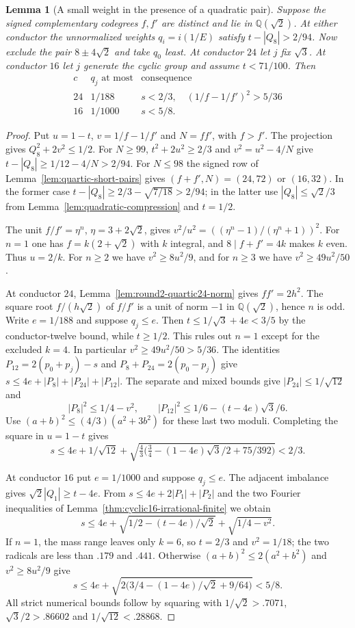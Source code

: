 \documentclass[11pt,reqno]{amsart}
\newtheorem{lemma}[theorem]{Lemma}
\theoremstyle{remark}\newtheorem{remark}[theorem]{Remark}
\numberwithin{equation}{section}
\begin{document}
\begin{lemma}[A small weight in the presence of a quadratic pair]\label{lem:1624-weight-cut}
Suppose the signed complementary codegrees $f,f'$ are distinct and
lie in $\mathbb Q(\sqrt2)$. At either conductor the unnormalized
weights $q_i=i(1/E)$ satisfy $t-|Q_8|>2/94$. Now exclude the pair
$8\pm4\sqrt2$ and take $q_0$ least. At conductor $24$ let $j$ fix
$\sqrt3$. At conductor $16$ let $j$ generate the cyclic group and
assume $t<71/100$. Then
\[
 \begin{array}{c|c|c}
 c&q_j\text{ at most}&\text{consequence}\\\hline
 24&1/188&s<2/3,\quad(1/f-1/f')^2>5/36\\
 16&1/1000&s<5/8 .
 \end{array}
\]
\end{lemma}
\begin{proof}
Put $u=1-t$, $v=1/f-1/f'$ and $N=ff'$, with $f>f'$.
The projection gives $Q_8^2+2v^2\le1/2$. For $N\ge99$,
$t^2+2u^2\ge2/3$ and $v^2=u^2-4/N$ give
$t-|Q_8|\ge1/12-4/N>2/94$. For $N\le98$ the signed row of
Lemma~\ref{lem:quartic-short-pairs} gives $(f+f',N)=(24,72)$ or
$(16,32)$. In the former case $t-|Q_8|\ge2/3-\sqrt{7/18}>2/94$;
in the latter use $|Q_8|\le\sqrt2/3$ from
Lemma~\ref{lem:quadratic-compression} and $t=1/2$.

The unit
$f/f'=\eta^n$, $\eta=3+2\sqrt2$, gives
$v^2/u^2=((\eta^n-1)/(\eta^n+1))^2$.
For $n=1$ one has $f=k(2+\sqrt2)$ with $k$ integral, and
$8\mid f+f'=4k$ makes $k$ even. Thus $u=2/k$.
For $n\ge2$ we have $v^2\ge8u^2/9$, and for $n\ge3$
we have $v^2\ge49u^2/50$.

At conductor $24$, Lemma~\ref{lem:round2-quartic24-norm} gives
$ff'=2h^2$. The square root $f/(h\sqrt2)$ of $f/f'$ is a unit of
norm $-1$ in $\mathbb Q(\sqrt2)$, hence $n$ is odd.
Write $e=1/188$ and suppose $q_j\le e$. Then
$t\le1/\sqrt3+4e<3/5$ by the conductor-twelve bound, while
$t\ge1/2$. This rules out $n=1$ except for the excluded $k=4$.
In particular $v^2\ge49u^2/50>5/36$.
The identities $P_{12}=2(p_0+p_j)-s$ and
$P_8+P_{24}=2(p_0-p_j)$ give
$s\le4e+|P_8|+|P_{24}|+|P_{12}|$. The separate and mixed bounds
give $|P_{24}|\le1/\sqrt{12}$ and
\[
 |P_8|^2\le1/4-v^2,\qquad
 |P_{12}|^2\le 1/6-(t-4e)\sqrt3/6 .
\]
Use $(a+b)^2\le(4/3)(a^2+3b^2)$ for these last two moduli.
Completing the square in $u=1-t$ gives
\[
 s\le4e+1/\sqrt{12}
  +\sqrt{\tfrac43\bigl(\tfrac34-(1-4e)\sqrt3/2+75/392\bigr)}
 <2/3 .
\]

At conductor $16$ put $e=1/1000$ and suppose $q_j\le e$.
The adjacent imbalance gives $\sqrt2|Q_1|\ge t-4e$.
From $s\le4e+2|P_1|+|P_2|$ and the two Fourier inequalities
of Lemma~\ref{thm:cyclic16-irrational-finite} we obtain
\begin{equation}\label{eq:round2-c16-cut}
 s\le4e+\sqrt{1/2-(t-4e)/\sqrt2}+\sqrt{1/4-v^2}.
\end{equation}
If $n=1$, the mass range leaves only $k=6$, so $t=2/3$ and
$v^2=1/18$; the two radicals are less than $.179$ and $.441$.
Otherwise $(a+b)^2\le2(a^2+b^2)$ and $v^2\ge8u^2/9$ give
\[
 s\le4e+\sqrt{2\bigl(3/4-(1-4e)/\sqrt2+9/64\bigr)}<5/8 .
\]
All strict numerical bounds follow by squaring with
$1/\sqrt2>.7071$, $\sqrt3/2>.86602$ and $1/\sqrt{12}<.28868$.
\end{proof}
\end{document}
